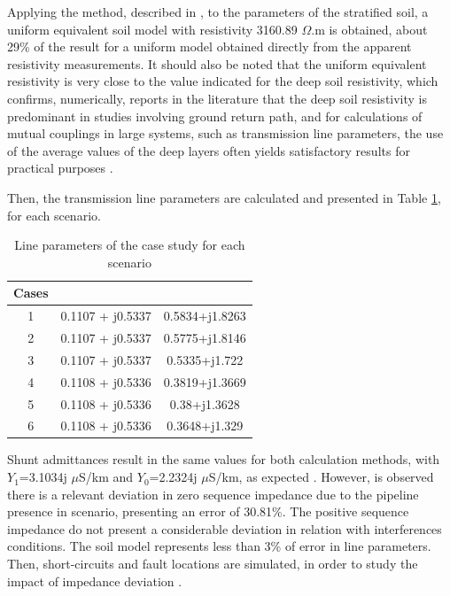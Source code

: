 \documentclass[conference]{IEEEtran}
\begin{document}
Applying the method, described in \cite{Martins-Britto2019}, to the parameters of the stratified soil, a uniform equivalent soil model with resistivity 3160.89 $\Omega$.m is obtained, about 29\% of the result for a uniform model obtained directly from the apparent resistivity measurements. It should also be noted that the uniform equivalent resistivity is very close to the value indicated for the deep soil resistivity, which confirms, numerically, reports in the literature that the deep soil resistivity is predominant in studies involving ground return path, and for calculations of mutual couplings in large systems, such as transmission line parameters, the use of the average values of the deep layers often yields satisfactory results for practical purposes \cite{Southey2005}.

Then, the transmission line parameters are calculated and presented in Table \ref{table:LineParam}, for each scenario.

\begin{table}[!hbt]
	\renewcommand{\arraystretch}{1.3}
	\centering
	\caption{Line parameters of the case study for each scenario}
	\begin{tabular}{|c|c|c|}
		\hline
		\textbf{Cases} & \multicolumn{1}{c|}{\textbf{\boldmath{$Z_{1}$ {[}$\Omega$/m{]}}}} & \multicolumn{1}{c|}{\textbf{\boldmath{$Z_{0}$ {[}$\Omega$/m{]}}}} \\ \hline
		1              & 0.1107 + j0.5337                              & 0.5834+j1.8263                                \\ \hline
		2              & 0.1107 + j0.5337                              & 0.5775+j1.8146                                \\ \hline
		3              & 0.1107 + j0.5337                              & 0.5335+j1.722                                 \\ \hline
		4              & 0.1108 + j0.5336                              & 0.3819+j1.3669                                \\ \hline
		5              & 0.1108 + j0.5336                              & 0.38+j1.3628                                  \\ \hline
		6              & 0.1108 + j0.5336                              & 0.3648+j1.329                                 \\ \hline
	\end{tabular}\label{table:LineParam}
\end{table}

Shunt admittances result in the same values for both calculation methods, with $Y_1$=3.1034j $\mu$S/km and $Y_0$=2.2324j $\mu$S/km, as expected \cite{Moraes2021}. However, is observed there is a relevant deviation in zero sequence impedance due to the pipeline presence in scenario, presenting an error of 30.81\%. The positive sequence impedance do not present a considerable deviation in relation with interferences conditions. The soil model represents less than 3\% of error in line parameters. Then, short-circuits and fault locations are simulated, in order to study the impact of impedance deviation \cite{Moraes2021}.
\end{document}
